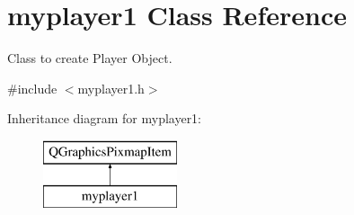 \hypertarget{classmyplayer1}{}\section{myplayer1 Class Reference}
\label{classmyplayer1}


Class to create Player Object.  




{\ttfamily \#include $<$myplayer1.\+h$>$}

Inheritance diagram for myplayer1\+:\begin{figure}[H]
\begin{center}
\leavevmode
\includegraphics[height=2.000000cm]{classmyplayer1}
\end{center}
\end{figure}
